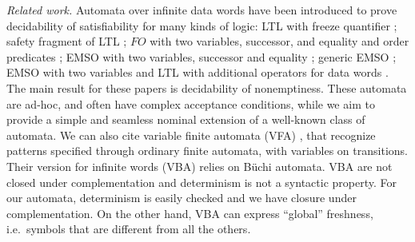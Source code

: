 \emph{Related work.} Automata over infinite data words have been introduced to prove decidability of satisfiability for many kinds of logic: LTL with freeze quantifier \cite{DemriL09}; safety fragment of LTL \cite{Lazic11}; $FO$ with two variables, successor, and equality and order predicates \cite{BojanczykDMSS11}; EMSO with two variables, successor and equality \cite{KaraST12}; generic EMSO \cite{Bollig11}; EMSO with two variables and LTL with additional operators for data words \cite{KaraT10}. The main result for these papers is decidability of nonemptiness. These automata are ad-hoc, and often have complex acceptance conditions, while we aim to provide a simple and seamless nominal extension of a well-known class of automata. We can also cite variable finite automata (VFA) \cite{GrumbergKS10}, that recognize patterns specified through ordinary finite automata, with variables on transitions. Their version for infinite words (VBA) relies on B\"uchi automata. VBA are not closed under complementation and determinism is not a syntactic property. For our automata, determinism is easily checked and we have closure under complementation. On the other hand, VBA can express ``global'' freshness, i.e.\ symbols that are different from all the others. 